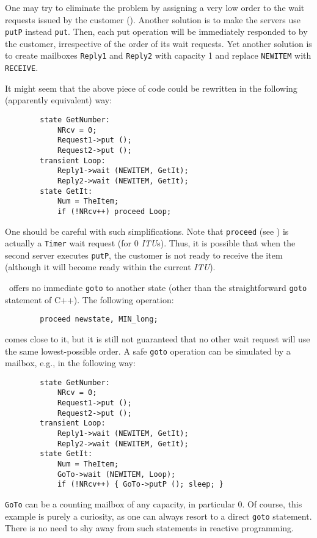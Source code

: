 One may try to eliminate the problem by assigning a very low order to
the wait requests issued by the customer ().
Another solution
is to make the servers use {\tt putP} instead {\tt put}.
Then, each put operation will be immediately responded to by the customer,
irrespective of the order of its wait requests.
Yet another solution is to create mailboxes {\tt Reply1} and {\tt Reply2}
with capacity 1 and replace {\tt NEWITEM} with {\tt RECEIVE}.

It might seem that the above piece of code could be rewritten in
the following (apparently equivalent) way:
\begin{verbatim}
        state GetNumber:
            NRcv = 0;
            Request1->put ();
            Request2->put ();
        transient Loop:
            Reply1->wait (NEWITEM, GetIt);
            Reply2->wait (NEWITEM, GetIt);
        state GetIt:
            Num = TheItem;
            if (!NRcv++) proceed Loop;
\end{verbatim}
One should be careful with such simplifications.
Note that {\tt proceed} (see ) is
actually a {\tt Timer} wait request (for 0 {\em ITU\/}s).
Thus, it is possible that when the second server executes {\tt putP},
the customer is not ready to receive the item (although it will become
ready within the current {\em ITU\/}).

\smurph\ offers no immediate {\tt goto} to another state (other than the
straightforward {\tt goto} statement of C++).
The following operation:
\begin{verbatim}
        proceed newstate, MIN_long;
\end{verbatim}
comes close to it, but it is still not guaranteed that no other wait request
will use the same lowest-possible order.
A safe {\tt goto} operation can be simulated by a mailbox, e.g., in
the following way:
\begin{verbatim}
        state GetNumber:
            NRcv = 0;
            Request1->put ();
            Request2->put ();
        transient Loop:
            Reply1->wait (NEWITEM, GetIt);
            Reply2->wait (NEWITEM, GetIt);
        state GetIt:
            Num = TheItem;
            GoTo->wait (NEWITEM, Loop);
            if (!NRcv++) { GoTo->putP (); sleep; }
\end{verbatim}
{\tt GoTo} can be a counting mailbox of any capacity, in particular 0.
Of course, this example is purely a curiosity, as one can always resort to a
direct {\tt goto} statement.
There is no need to shy away from such statements in reactive programming.

